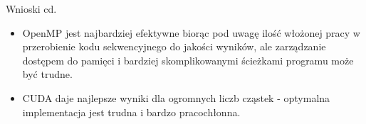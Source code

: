 \documentclass[handout]{beamer}
\begin{document}
\begin{frame}{Wnioski cd.}
\begin{itemize}
\item OpenMP jest najbardziej efektywne biorąc pod uwagę ilość włożonej pracy w przerobienie kodu sekwencyjnego do jakości wyników, ale zarządzanie dostępem do pamięci i bardziej skomplikowanymi ścieżkami programu może być trudne.
\item CUDA daje najlepsze wyniki dla ogromnych liczb cząstek - optymalna implementacja jest trudna i bardzo pracochłonna.
\end{itemize}
\end{frame}
\end{document}
